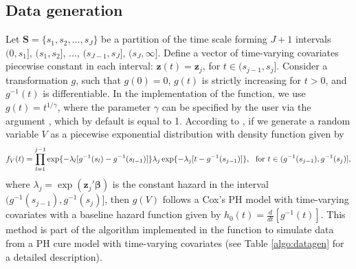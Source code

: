\subsection{Data generation}
Let $\mathbf{S}=\{s_1,s_2,...,s_J\}$ be a partition of the time scale forming $J+1$ intervals $(0,s_1]$, $(s_1,s_2]$, $...$, $(s_{J-1},s_J]$, $(s_{J},\infty]$.
Define a vector of time-varying covariates piecewise constant in each interval: $\mathbf{z}(t)=\mathbf{z}_j$, for $t\in(s_{j-1},s_j]$. 
Consider a transformation $g$, such that $g(0)=0$, $g(t)$ is strictly increasing for $t>0$, and $g^{-1}(t)$ is differentiable.
In the implementation of the  function, we use $g(t)=t^{1/\gamma}$, where the parameter $\gamma$ can be specified by the user via the argument , which by default is equal to 1.
According to \citet{Hendry_2014}, if we generate a random variable $V$ as a piecewise exponential distribution with density function given by
$$f_V(t) = \prod_{l=1}^{j-1} \exp\{-\lambda_l[g^{-1}(s_l)-g^{-1}(s_{l-1})]\} \lambda_j \exp\{-\lambda_j[t-g^{-1}(s_{j-1})]\}, \ \ \hbox{for } t\in(g^{-1}(s_{j-1}),g^{-1}(s_j)],$$
where $\lambda_j=\exp(\mathbf{z}_j'\boldsymbol{\beta})$ is the constant hazard in the interval $(g^{-1}(s_{j-1}),g^{-1}(s_{j})]$, then $g(V)$ follows a Cox's PH model with time-varying covariates with a baseline hazard function given by $h_0(t)=\frac{d}{dt}[g^{-1}(t)]$.
This method is part of the algorithm implemented in the  function to simulate data from a PH cure model with time-varying covariates (see Table \ref{algo:datagen} for a detailed description).

